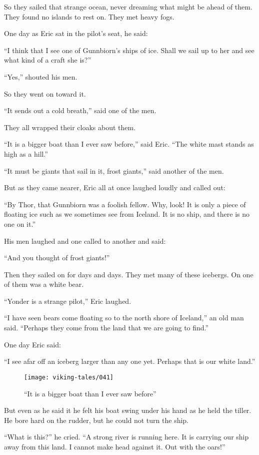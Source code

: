 So they sailed that strange ocean, never dreaming what might be ahead of
them. They found no islands to rest on. They met heavy fogs.

One day as Eric sat in the pilot's seat, he said:

``I think that I see one of Gunnbiorn's ships of ice. Shall we sail up
to her and see what kind of a craft she is?''

``Yes,'' shouted his men.

So they went on toward it.

``It sends out a cold breath,'' said one of the men.

They all wrapped their cloaks about them.

``It is a bigger boat than I ever saw before,'' said Eric. ``The white
mast stands as high as a hill.''

``It must be giants that sail in it, frost giants,'' said another of the
men.

But as they came nearer, Eric all at once laughed loudly and called out:

``By Thor, that Gunnbiorn was a foolish fellow. Why, look! It is only a
piece of floating ice such as we sometimes see from Iceland. It is no
ship, and there is no one on it.''

His men laughed and one called to another and said:

``And you thought of frost giants!''

Then they sailed on for days and days. They met many of these icebergs.
On one of them was a white bear.

``Yonder is a strange pilot,'' Eric laughed.

``I have seen bears come floating so to the north shore of Iceland,'' an
old man said. ``Perhaps they come from the land that we are going to
find.''

One day Eric said:

``I see afar off an iceberg larger than any one yet. Perhaps that is our
white land.''

\begin{figure}
    \centering
    \texttt{[image: viking-tales/041]}
    \caption{``It is a bigger boat than I ever saw before''}
\end{figure}

But even as he said it he felt his boat swing under his hand as he held
the tiller. He bore hard on the rudder, but he could not turn the ship.

``What is this?'' he cried. ``A strong river is running here. It is
carrying our ship away from this land. I cannot make head against it.
Out with the oars!''

